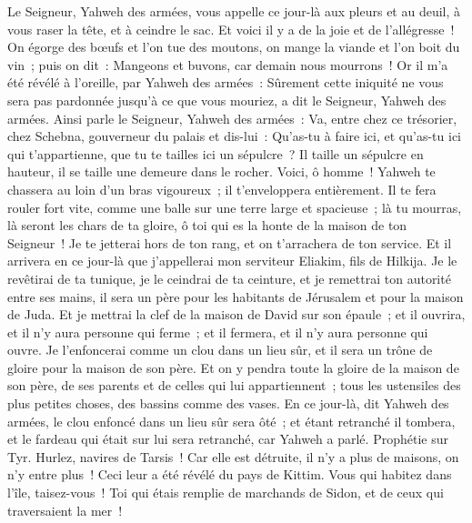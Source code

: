 \begin{multicols}{2}
Le Seigneur, Yahweh des armées, vous appelle ce jour-là aux pleurs et au deuil, à vous raser la tête, et à ceindre le sac.
Et voici il y a de la joie et de l'allégresse~! On égorge des bœufs et l'on tue des moutons, on mange la viande et l'on boit du vin~; puis on dit~: Mangeons et buvons, car demain nous mourrons~!
Or il m'a été révélé à l'oreille, par Yahweh des armées~: Sûrement cette iniquité ne vous sera pas pardonnée jusqu'à ce que vous mouriez, a dit le Seigneur, Yahweh des armées.
Ainsi parle le Seigneur, Yahweh des armées~: Va, entre chez ce trésorier, chez Schebna, gouverneur du palais et dis-lui~:
Qu'as-tu à faire ici, et qu'as-tu ici qui t'appartienne, que tu te tailles ici un sépulcre~? Il taille un sépulcre en hauteur, il se taille une demeure dans le rocher.
Voici, ô homme~! Yahweh te chassera au loin d'un bras vigoureux~; il t'enveloppera entièrement.
Il te fera rouler fort vite, comme une balle sur une terre large et spacieuse~; là tu mourras, là seront les chars de ta gloire, ô toi qui es la honte de la maison de ton Seigneur~!
Je te jetterai hors de ton rang, et on t'arrachera de ton service.
Et il arrivera en ce jour-là que j'appellerai mon serviteur Eliakim, fils de Hilkija.
Je le revêtirai de ta tunique, je le ceindrai de ta ceinture, et je remettrai ton autorité entre ses mains, il sera un père pour les habitants de Jérusalem et pour la maison de Juda.
Et je mettrai la clef de la maison de David sur son épaule~; et il ouvrira, et il n'y aura personne qui ferme~; et il fermera, et il n'y aura personne qui ouvre.
Je l'enfoncerai comme un clou dans un lieu sûr, et il sera un trône de gloire pour la maison de son père.
Et on y pendra toute la gloire de la maison de son père, de ses parents et de celles qui lui appartiennent~; tous les ustensiles des plus petites choses, des bassins comme des vases.
En ce jour-là, dit Yahweh des armées, le clou enfoncé dans un lieu sûr sera ôté~; et étant retranché il tombera, et le fardeau qui était sur lui sera retranché, car Yahweh a parlé.
\VerseOne{}Prophétie sur Tyr. Hurlez, navires de Tarsis~! Car elle est détruite, il n'y a plus de maisons, on n'y entre plus~! Ceci leur a été révélé du pays de Kittim.
Vous qui habitez dans l'île, taisez-vous~! Toi qui étais remplie de marchands de Sidon, et de ceux qui traversaient la mer~!

\end{multicols}
